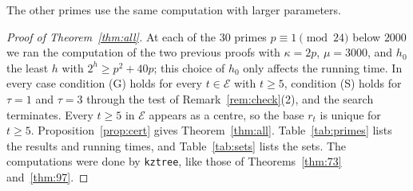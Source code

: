 \documentclass[12pt]{amsart}
\theoremstyle{definition}
\newcommand{\cE}{\mathcal{E}}
\begin{document}
The other primes use the same computation with larger parameters.

\begin{proof}[Proof of Theorem~\ref{thm:all}]
At each of the 30 primes $p\equiv1\pmod{24}$ below $2000$ we ran the computation of the two previous proofs with $\kappa=2p$, $\mu=3000$, and $h_0$ the least $h$ with $2^h\ge p^2+40p$; this choice of $h_0$ only affects the running time. In every case condition (G) holds for every $t\in\cE$ with $t\ge5$, condition (S) holds for $\tau=1$ and $\tau=3$ through the test of Remark~\ref{rem:check}(2), and the search terminates. Every $t\ge5$ in $\cE$ appears as a centre, so the base $r_t$ is unique for $t\ge5$. Proposition~\ref{prop:cert} gives Theorem~\ref{thm:all}. Table~\ref{tab:primes} lists the results and running times, and Table~\ref{tab:sets} lists the sets. The computations were done by \texttt{kztree}, like those of Theorems~\ref{thm:73} and~\ref{thm:97}.
\end{proof}
\end{document}
